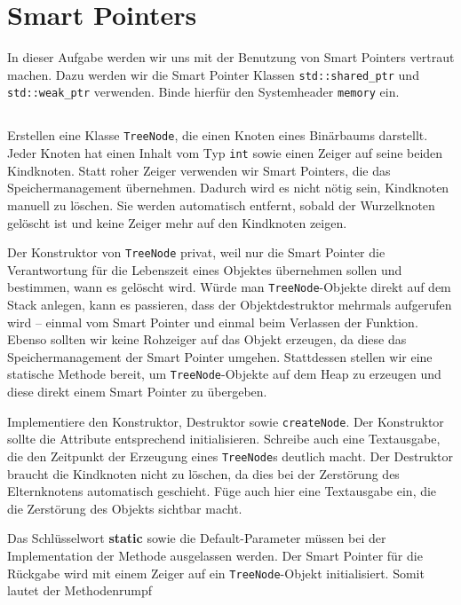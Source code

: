 \section{\ExercisePrefixMemory Smart Pointers}
In dieser Aufgabe werden wir uns mit der Benutzung von Smart Pointers vertraut machen. Dazu werden wir die Smart Pointer Klassen \lstinline{std::shared_ptr} und \lstinline{std::weak_ptr} verwenden. Binde hierfür den Systemheader \lstinline{memory} ein.


\subsection{}
Erstellen eine Klasse \lstinline{TreeNode}, die einen Knoten eines Binärbaums darstellt.
Jeder Knoten hat einen Inhalt vom Typ \lstinline{int} sowie einen Zeiger auf seine beiden Kindknoten.
Statt \glqq roher\grqq{} Zeiger verwenden wir Smart Pointers, die das Speichermanagement übernehmen.
Dadurch wird es nicht nötig sein, Kindknoten manuell zu löschen.
Sie werden automatisch entfernt, sobald der Wurzelknoten gelöscht ist und keine Zeiger mehr auf den Kindknoten zeigen.



Der Konstruktor von \lstinline{TreeNode} privat, weil nur die Smart Pointer die Verantwortung für die Lebenszeit eines Objektes übernehmen sollen und bestimmen, wann es gelöscht wird.
Würde man \lstinline{TreeNode}-Objekte direkt auf dem Stack anlegen, kann es passieren, dass der Objektdestruktor mehrmals aufgerufen wird -- einmal vom Smart Pointer und einmal beim Verlassen der Funktion.
Ebenso sollten wir keine Rohzeiger auf das Objekt erzeugen, da diese das Speichermanagement der Smart Pointer umgehen.
Stattdessen stellen wir eine statische Methode bereit, um \lstinline{TreeNode}-Objekte auf dem Heap zu erzeugen und diese direkt einem Smart Pointer zu übergeben.

Implementiere den Konstruktor, Destruktor sowie \lstinline{createNode}.
Der Konstruktor sollte die Attribute entsprechend initialisieren.
Schreibe auch eine Textausgabe, die den Zeitpunkt der Erzeugung eines \lstinline{TreeNode}s deutlich macht.
Der Destruktor braucht die Kindknoten nicht zu löschen, da dies bei der Zerstörung des Elternknotens automatisch geschieht.
Füge auch hier eine Textausgabe ein, die die Zerstörung des Objekts sichtbar macht.

Das Schlüsselwort \textbf{static} sowie die Default-Parameter müssen bei der Implementation der Methode ausgelassen werden.
Der Smart Pointer für die Rückgabe wird mit einem Zeiger auf ein \lstinline{TreeNode}-Objekt initialisiert. Somit lautet der Methodenrumpf

